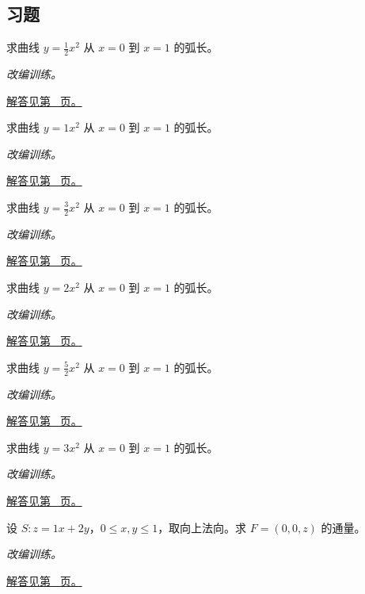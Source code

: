 \documentclass[12pt,fontset=fandol]{ctexart}
\begin{document}
\subsection{习题}
\begin{example}[抛物线弧长]\label{ex:c42q1}
求曲线 $y=\frac{1}{2}x^2$ 从 $x=0$ 到 $x=1$ 的弧长。
\par\textit{改编训练。}\par\hyperref[ans:c42q1]{解答见第~\pageref{ans:c42q1} 页。}
\end{example}
\begin{example}[抛物线弧长]\label{ex:c42q2}
求曲线 $y=1x^2$ 从 $x=0$ 到 $x=1$ 的弧长。
\par\textit{改编训练。}\par\hyperref[ans:c42q2]{解答见第~\pageref{ans:c42q2} 页。}
\end{example}
\begin{example}[抛物线弧长]\label{ex:c42q3}
求曲线 $y=\frac{3}{2}x^2$ 从 $x=0$ 到 $x=1$ 的弧长。
\par\textit{改编训练。}\par\hyperref[ans:c42q3]{解答见第~\pageref{ans:c42q3} 页。}
\end{example}
\begin{example}[抛物线弧长]\label{ex:c42q4}
求曲线 $y=2x^2$ 从 $x=0$ 到 $x=1$ 的弧长。
\par\textit{改编训练。}\par\hyperref[ans:c42q4]{解答见第~\pageref{ans:c42q4} 页。}
\end{example}
\begin{example}[抛物线弧长]\label{ex:c42q5}
求曲线 $y=\frac{5}{2}x^2$ 从 $x=0$ 到 $x=1$ 的弧长。
\par\textit{改编训练。}\par\hyperref[ans:c42q5]{解答见第~\pageref{ans:c42q5} 页。}
\end{example}
\begin{example}[抛物线弧长]\label{ex:c42q6}
求曲线 $y=3x^2$ 从 $x=0$ 到 $x=1$ 的弧长。
\par\textit{改编训练。}\par\hyperref[ans:c42q6]{解答见第~\pageref{ans:c42q6} 页。}
\end{example}
\begin{example}[平面片的向上通量]\label{ex:c42q7}
设 $S:z=1x+2y$，$0\le x,y\le1$，取向上法向。求 $F=(0,0,z)$ 的通量。
\par\textit{改编训练。}\par\hyperref[ans:c42q7]{解答见第~\pageref{ans:c42q7} 页。}
\end{example}
\end{document}
